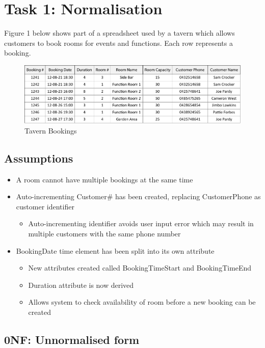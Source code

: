 \section{Task 1: Normalisation}

Figure 1 below shows part of a spreadsheet used by a tavern which allows customers to book rooms for events and functions. Each row represents a booking.

\begin{figure}[H]
\centering
\caption{Tavern Bookings}
\includegraphics[scale=1]{./img/task1.pdf}
\end{figure}

\subsection*{Assumptions}

\begin{itemize}
\item A room cannot have multiple bookings at the same time
\item Auto-incrementing Customer\# has been created, replacing CustomerPhone as customer identifier
	\begin{itemize}
	\item Auto-incrementing identifier avoids user input error which may result in multiple customers with the same phone number
	\end{itemize}
\item BookingDate time element has been split into its own attribute
	\begin{itemize}
	\item New attributes created called BookingTimeStart and BookingTimeEnd
	\item Duration attribute is now derived
	\item Allows system to check availability of room before a new booking can be created
	\end{itemize}
\end{itemize}

\subsection{0NF: Unnormalised form}

